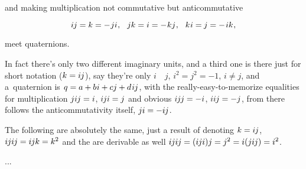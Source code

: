 \noindent
and making multiplication
not commutative but anticommutative

\begin{equation}\label{moredefinitionalequationsforquaternions}
i \hspace{-0.1ex} j = k = - \hspace{.1ex} ji \hspace{.1ex} , \hspace{.7em}
jk = i = - \hspace{.1ex} kj \hspace{.1ex} , \hspace{.7em}
k \hspace{.1ex} i = \hspace{-0.1ex} j = - \hspace{.2ex} ik \hspace{.1ex} ,
\end{equation}

\noindent
meet quaternions.

In fact there’s only two different imaginary units,
and a third one is there just for short notation (${k = i \hspace{-0.1ex} j}$),
say they’re only $i$~~$j$, ${i^2 = j^2 = -1}$, ${i \neq j}$,
and a~quaternion is ${q = a + b \hspace{.1ex} i + cj + d \hspace{.2ex} i \hspace{-0.1ex} j}$,
with the really-easy-to-memorize equalities for multiplication
${j i \hspace{-0.1ex} j = i}$, ${i \hspace{-0.1ex} j i = j}$
and obvious
${i \hspace{-0.1ex} j \hspace{-0.1ex} j = -i}$, ${ii \hspace{-0.1ex} j = -j}$,
from there follows the anticommutativity itself,
${ji = -i \hspace{-0.1ex} j}$.

The following are absolutely the same,
just a result of denoting ${k = i \hspace{-0.1ex} j}$,
${i \hspace{-0.1ex} j i \hspace{-0.1ex} j = i \hspace{-0.1ex} j k = k^2}$
and the  are derivable as well
${i \hspace{-0.1ex} j i \hspace{-0.1ex} j = (i \hspace{-0.1ex} ji)j = j^2 = i(ji \hspace{-0.1ex} j) = i^2}$.

...


